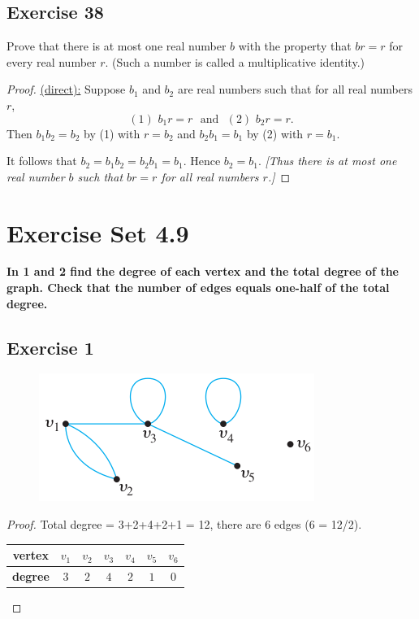 \documentclass[14pt]{extarticle}
\newcommand{\cy}{\color{cyan}}
\begin{document}
\subsection{Exercise 38}
Prove that there is at most one real number $b$ with the property that $br = r$ for every real number $r$. (Such a number is called a multiplicative identity.)

\begin{proof}
\underline{(direct):} Suppose $b_1$ and $b_2$ are real numbers such that for all real numbers $r$,
\[
(1) \,\, b_1 r = r \,\,\text{ and }\,\, (2) \,\, b_2 r = r.
\]
Then $b_1 b_2 = b_2$ by (1) with $r = b_2$ and $b_2 b_1 = b_1$ by (2) with $r = b_1$.

It follows that $b_2 = b_1 b_2 = b_2 b_1 = b_1$. Hence $b_2 = b_1$. {\it [Thus there is at most one real number $b$ such that $br = r$ for all real numbers $r$.]}
\end{proof}

\section{Exercise Set 4.9}

{\bf \cy In 1 and 2 find the degree of each vertex and the total degree of the graph. Check that the number of edges equals one-half of the total degree.}

\subsection{Exercise 1}
\begin{figure}[ht!]
\centering
\includegraphics[scale=0.5]{../images/4.9.1.png}
\end{figure}

\begin{proof}
Total degree = 3+2+4+2+1 = 12, there are 6 edges (6 = 12/2).
\begin{center}
\begin{tabular}{|c|c|c|c|c|c|c|}
\hline
{\bf vertex} & $v_1$ & $v_2$ & $v_3$ & $v_4$ & $v_5$ & $v_6$ \\
\hline
{\bf degree} & $3$ & $2$ & $4$ & $2$ & $1$ & $0$ \\
\hline
\end{tabular}
\end{center}
\end{proof}
\end{document}

